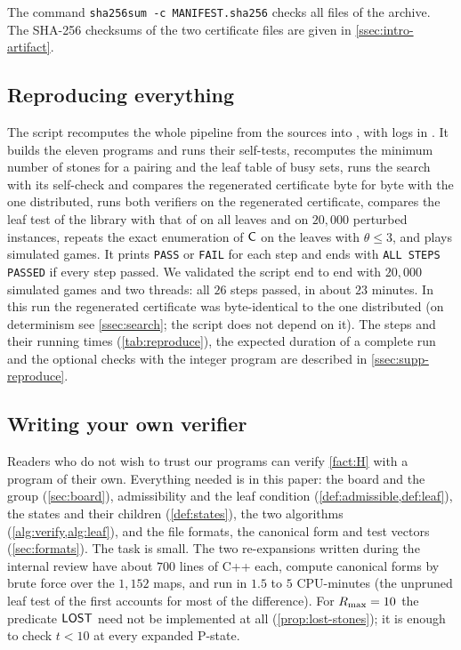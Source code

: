 The command \texttt{sha256sum -c MANIFEST.sha256} checks all files of the archive. The SHA-256
checksums of the two certificate files are given in \cref{ssec:intro-artifact}.

\subsection{Reproducing everything}\label{ssec:reproduce}

The script  recomputes the whole pipeline from the sources into
, with logs in . It builds the eleven programs and runs their
self-tests, recomputes the minimum number of stones for a pairing and the leaf table of busy sets, runs
the search with its self-check and compares the regenerated certificate byte for byte with the one
distributed, runs both verifiers on the regenerated certificate, compares the leaf test of the library
with that of  on all leaves and on $20{,}000$ perturbed instances, repeats the exact
enumeration of $\mathsf{C}$ on the leaves with $\theta\le 3$, and plays simulated games. It prints \texttt{PASS}
or \texttt{FAIL} for each step and ends with \texttt{ALL STEPS PASSED} if every step passed. We validated
the script end to end with $20{,}000$ simulated games and two threads: all $26$ steps passed, in about
$23$ minutes. In this run the regenerated certificate was byte-identical to the one distributed
(on determinism see \cref{ssec:search}; the script does not depend on it). The steps and their running times
(\cref{tab:reproduce}), the expected duration of a complete run and the optional checks with the integer
program are described in \cref{ssec:supp-reproduce}.

\subsection{Writing your own verifier}\label{ssec:own}

Readers who do not wish to trust our programs can verify \cref{fact:H} with a program of
their own. Everything needed is in this paper: the board and the group (\cref{sec:board}), admissibility and
the leaf condition (\cref{def:admissible,def:leaf}), the states and their children (\cref{def:states}), the
two algorithms (\cref{alg:verify,alg:leaf}), and the file formats, the canonical form and test vectors
(\cref{sec:formats}). The task is small. The two re-expansions written during the internal review have
about $700$
lines of C++ each, compute canonical forms by brute force over the $1{,}152$ maps, and run in $1.5$ to
$5$ CPU-minutes (the unpruned leaf test of the first accounts for most of the difference). For
$R_{\max}=10$ the predicate $\mathsf{LOST}$ need not be implemented at all
(\cref{prop:lost-stones}); it is enough to check $t<10$ at every expanded P-state.

